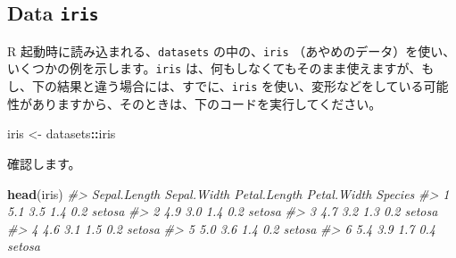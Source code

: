 \documentclass[
  xelatex, ja=standard]{bxjsbook}
\newenvironment{Shaded}{\begin{snugshade}}{\end{snugshade}}
\newcommand{\CommentTok}[1]{\textcolor[rgb]{0.56,0.35,0.01}{\textit{#1}}}
\newcommand{\FunctionTok}[1]{\textcolor[rgb]{0.13,0.29,0.53}{\textbf{#1}}}
\newcommand{\NormalTok}[1]{#1}
\newcommand{\OtherTok}[1]{\textcolor[rgb]{0.56,0.35,0.01}{#1}}
\newcommand{\SpecialCharTok}[1]{\textcolor[rgb]{0.81,0.36,0.00}{\textbf{#1}}}
\theoremstyle{definition}
\theoremstyle{definition}
\theoremstyle{definition}
\theoremstyle{definition}
\theoremstyle{remark}
\begin{document}
\hypertarget{data-iris}{%
\subsection{\texorpdfstring{Data \texttt{iris}}{Data iris}}\label{data-iris}}

R 起動時に読み込まれる、\texttt{datasets} の中の、\texttt{iris} （あやめのデータ）を使い、いくつかの例を示します。\texttt{iris} は、何もしなくてもそのまま使えますが、もし、下の結果と違う場合には、すでに、\texttt{iris} を使い、変形などをしている可能性がありますから、そのときは、下のコードを実行してください。

\begin{Shaded}
\begin{Highlighting}[]
\NormalTok{iris }\OtherTok{\textless{}{-}}\NormalTok{ datasets}\SpecialCharTok{::}\NormalTok{iris}
\end{Highlighting}
\end{Shaded}

確認します。

\begin{Shaded}
\begin{Highlighting}[]
\FunctionTok{head}\NormalTok{(iris)}
\CommentTok{\#\textgreater{}   Sepal.Length Sepal.Width Petal.Length Petal.Width Species}
\CommentTok{\#\textgreater{} 1          5.1         3.5          1.4         0.2  setosa}
\CommentTok{\#\textgreater{} 2          4.9         3.0          1.4         0.2  setosa}
\CommentTok{\#\textgreater{} 3          4.7         3.2          1.3         0.2  setosa}
\CommentTok{\#\textgreater{} 4          4.6         3.1          1.5         0.2  setosa}
\CommentTok{\#\textgreater{} 5          5.0         3.6          1.4         0.2  setosa}
\CommentTok{\#\textgreater{} 6          5.4         3.9          1.7         0.4  setosa}
\end{Highlighting}
\end{Shaded}

\begin{Shaded}
\end{Shaded}
\end{document}
